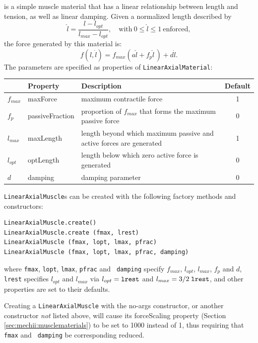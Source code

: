is a simple muscle material that has a linear relationship between
length and tension, as well as linear damping. Given a normalized
length described by
%
\begin{equation}
\hat l= \frac{l - l_{opt}}{l_{max} - l_{opt}}, 
\quad \mathrm{with}~ 0 \le \hat l \le 1~\mathrm{enforced},
\end{equation}
%
the force generated by this material is:
%
\begin{equation}
f(l, \dot l) = f_{max} \left( a \hat l +  f_{p} \hat l \, \right) + d \dot l.
\label{LinearAxialMaterial:eqn}
\end{equation}
%
The parameters are specified as properties of {\tt LinearAxialMaterial}:

\begin{center}
\begin{tabular}{|l|l|l|c|} \hline
& Property & Description & Default \\
\hline
$f_{max}$ & {\sf maxForce} & maximum contractile force & 1 \\
$f_{p}$ & {\sf passiveFraction} & 
proportion of $f_{max}$ that forms the maximum passive force & 0 \\
$l_{max}$ & {\sf maxLength} &
length beyond which maximum passive and active forces are generated & 1 \\
$l_{opt}$ & {\sf optLength} &
length below which zero active force is generated & 0 \\
$d$ & {\sf damping} & damping parameter & 0 \\
\hline
\end{tabular}
\end{center}

{\tt LinearAxialMuscle}s can be created with the following factory
methods and constructors:
\begin{lstlisting}[]
LinearAxialMuscle.create()
LinearAxialMuscle.create (fmax, lrest)
LinearAxialMuscle (fmax, lopt, lmax, pfrac)
LinearAxialMuscle (fmax, lopt, lmax, pfrac, damping)
\end{lstlisting}
%
where {\tt fmax}, {\tt lopt}, {\tt lmax}, {\tt pfrac} and {\tt
damping} specify $f_{max}$, $l_{opt}$, $l_{max}$, $f_{p}$ and $d$,
{\tt lrest} specifies $l_{opt}$ and $l_{max}$ via
$l_{opt} = \mathrm{\tt lrest}$ and
$l_{max} = 3/2 \; \mathrm{\tt lrest}$, and other properties are set to
their defaults.

\begin{sideblock}
Creating a {\tt LinearAxialMuscle} with the no-args constructor, or
another constructor {\it not} listed above, will cause its {\sf
forceScaling} property (Section \ref{sec:mechii:musclematerials}) to
be set to 1000 instead of 1, thus requiring that {\tt fmax} and {\tt
damping} be corresponding reduced.
\end{sideblock}

